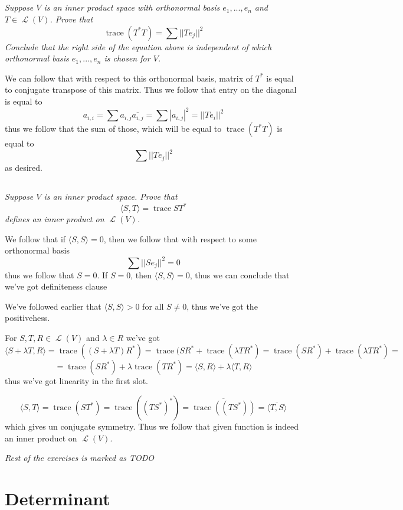 \documentclass[11pt,oneside,titlepage]{book}
\DeclareMathOperator \map {\mathcal {L}}
\DeclareMathOperator \trace {trace}
\newcommand{\eangle}[1]{\langle #1 \rangle}
\begin{document}
\subsection{}

\textit{Suppose $V$ is an inner product space with orthonormal basis $e_1, ..., e_n$
  and $T \in \map(V)$. Prove that
  $$\trace(T^* T) = \sum{||T e_j||^2}$$
  Conclude that the right side of the equation above is independent of which orthonormal basis
  $e_1, ..., e_n$ is chosen for $V$.}

We can follow that with respect to this orthonormal basis, matrix of $T^*$ is equal
to conjugate transpose of this matrix. Thus we follow that entry on the diagonal is
equal to
$$a_{i, i} = \sum{a_{i, j} \overline{a_{i, j}}} =
\sum{|a_{i, j}|^2} = ||T e_i||^2$$
thus we follow that the sum of those, which will be equal to $\trace(T^* T)$ is equal to
$$\sum{||T e_j||^2}$$
as desired.

\subsection{}

\textit{Suppose $V$ is an inner product space. Prove that
  $$\eangle{S, T} = \trace{S T^*}$$
  defines an inner product on $\map(V)$.
}

We follow that if $\eangle{S, S} = 0$, then we follow that with respect to some orthonormal
basis
$$\sum{||Se_j||^2} = 0$$
thus we follow that $S = 0$. If $S = 0$, then $\eangle{S, S} = 0$, thus we can conclude that
we've got definiteness clause

We've followed earlier that $\eangle{S, S} > 0$ for all $S \neq 0$, thus we've got the
positivehess.

For $S, T, R \in  \map(V)$ and $\lambda \in R$ we've got
$$\eangle{S + \lambda T, R} = \trace((S + \lambda T) R^*) =
\trace(SR^* + \trace(\lambda TR^*) = \trace(SR^*) + \trace(\lambda TR^*) = $$
$$ =
\trace(SR^*) + \lambda \trace( TR^*) = \eangle{S, R} + \lambda \eangle{T, R}$$
thus we've got linearity in the first slot.

$$\eangle{S, T} = \trace(S T^*) = \trace((T S^*)^*) = \overline{\trace((T S^*))} =
\overline{\eangle{T, S}}$$
which gives un conjugate symmetry. Thus we follow that given function is indeed an
inner product on $\map(V)$.

\textit{Rest of the exercises is marked as TODO}

\section{Determinant}
\end{document}
